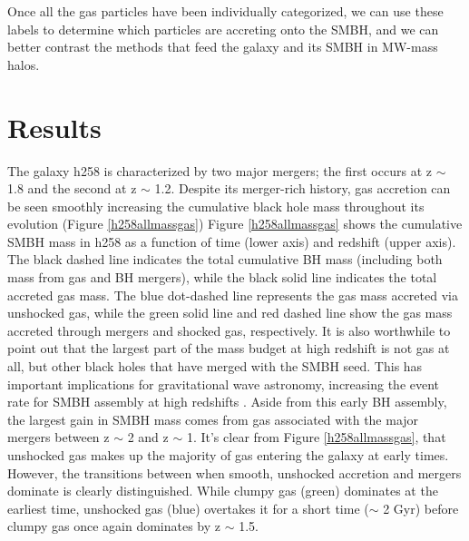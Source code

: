 \documentclass[manuscript]{aastex}
\begin{document}
Once all the gas particles have been individually categorized, we can use these labels to determine which particles are accreting onto the SMBH, and we can better contrast the methods that feed the galaxy and its SMBH in MW-mass halos.




\section{Results} \label{results}




The galaxy h258 is characterized by two major mergers; the first occurs at z $\sim$ 1.8 and the second at z $\sim$ 1.2. Despite its merger-rich history, gas accretion can be seen smoothly increasing the cumulative black hole mass throughout its evolution (Figure \ref{h258allmassgas}) Figure \ref{h258allmassgas} shows the cumulative SMBH mass in h258 as a function of time (lower axis) and redshift (upper axis). The black dashed line indicates the total cumulative BH mass (including both mass from gas and BH mergers), while the black solid line indicates the total accreted gas mass. The blue dot-dashed line represents the gas mass accreted via unshocked gas, while the green solid line and red dashed line show the gas mass accreted through mergers and shocked gas, respectively. It is also worthwhile to point out that the largest part of the mass budget at high redshift is not gas at all, but other black holes that have merged with the SMBH seed. This has important implications for gravitational wave astronomy, increasing the event rate for SMBH assembly at high redshifts \citep{Holley-Bockelmann2010}. Aside from this early BH assembly, the largest gain in SMBH mass comes from gas associated with the major mergers between z $\sim$ 2 and z $\sim$ 1. It's clear from Figure \ref{h258allmassgas}, that unshocked gas makes up the majority of gas entering the galaxy at early times. However, the transitions between when smooth, unshocked accretion and mergers dominate is clearly distinguished. While clumpy gas (green) dominates at the earliest time, unshocked gas (blue) overtakes it for a short time ($\sim$ 2 Gyr) before clumpy gas once again dominates by z $\sim$ 1.5. 
\end{document}
